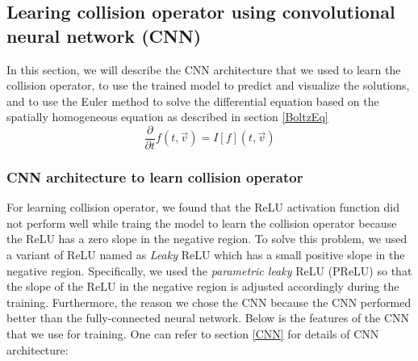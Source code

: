 \documentclass{article}
\begin{document}
\subsection{Learing collision operator using convolutional neural network (CNN)}
In this section, we will describe the CNN architecture that we used to learn the collision operator, to use the trained model to predict and visualize the solutions, and to use the Euler method to solve the differential equation based on the spatially homogeneous equation as described in section \ref{BoltzEq}
\begin{equation}
\frac{\partial}{\partial t}f(t,\vec{v}) = I[f](t, \vec{v})
\end{equation}

\subsubsection{CNN architecture to learn collision operator} \label{learnCollOpCNN}
For learning collision operator, we found that the ReLU activation function did not perform well while traing the model to learn the collision operator because the ReLU has a zero slope in the negative region. To solve this problem, we used a variant of ReLU named as \emph{Leaky} ReLU which has a small positive slope in the negative region. Specifically, we used the \emph{parametric leaky} ReLU (PReLU) so that the slope of the ReLU in the negative region is adjusted accordingly during the training. Furthermore, the reason we chose the CNN because the CNN performed better than the fully-connected neural network. Below is the features of the CNN that we use for training. One can refer to section \ref{CNN} for details of CNN architecture:
\end{document}

